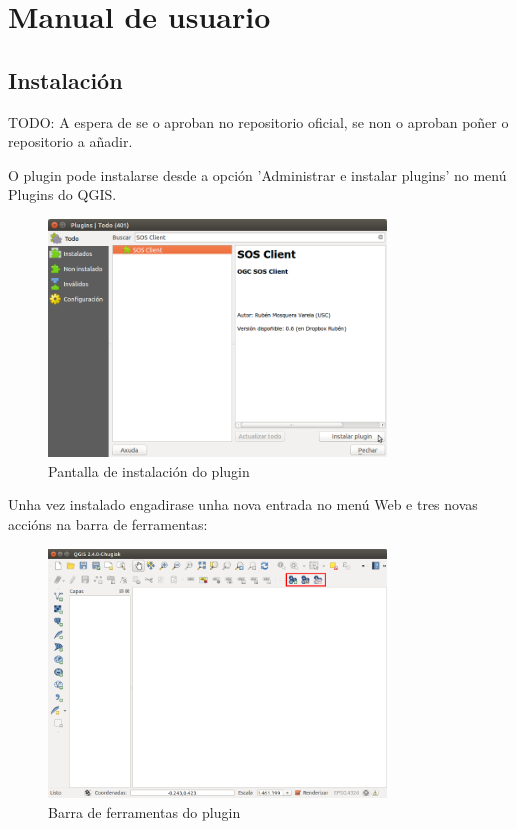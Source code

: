 \chapter{Manual de usuario}
\section{Instalación}
TODO: A espera de se o aproban no repositorio oficial, se non o aproban poñer o repositorio a añadir.

O plugin pode instalarse desde a opción 'Administrar e instalar plugins' no menú Plugins do QGIS.
\begin{figure}[hbtp]
\centering
\includegraphics[width=0.8\textwidth]{images/manual/instalar.png}
\caption{Pantalla de instalación do plugin}
\label{fig:install}
\end{figure}

Unha vez instalado engadirase unha nova entrada no menú Web e tres novas accións na barra de ferramentas:
\begin{figure}[hbtp]
\centering
\includegraphics[width=0.8\textwidth]{images/manual/toolbar.png}
\caption{Barra de ferramentas do plugin}
\label{fig:toolbar}
\end{figure}

